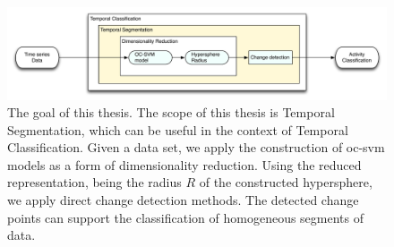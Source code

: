 \begin{figure}
  \centering
    \includegraphics[width=\textwidth,height=\textheight,keepaspectratio]{./Figures/chapter1/thesis_goal.pdf}
  \caption[Thesis goal]{The goal of this thesis. The scope of this thesis is Temporal Segmentation, which can be useful in the context of Temporal Classification. Given a data set, we apply the construction of \gls{oc-svm} models as a form of dimensionality reduction. Using the reduced representation, being the radius $R$ of the constructed hypersphere, we apply direct change detection methods. The detected change points can support the classification of homogeneous segments of data.}
  \label{fig:thesis_goal}
\end{figure}